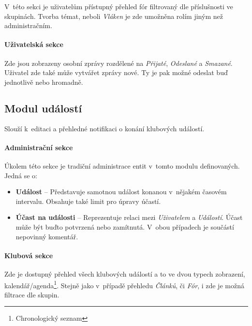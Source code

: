\documentclass[11pt,oneside]{fithesis}
\begin{document}
            V této sekci je uživatelům přístupný přehled fór filtrovaný dle příslušnosti ve skupinách.
            Tvorba témat, neboli \textit{Vláken} je zde umožněna rolím jiným než administračním.

            \paragraph*{Uživatelská sekce}

            Zde jsou zobrazeny osobní zprávy rozdělené na \textit{Přijaté}, \textit{Odeslané}       a \textit{Smazané}. Uživatel zde také může vytvářet zprávy nové. Ty je pak možné odeslat buď jednotlivě nebo hromadně.



            \subsection{Modul událostí}
            Slouží k editaci a přehledné notifikaci o konání klubových událostí.

            \paragraph*{Administrační sekce}

            Úkolem této sekce je tradiční administrace entit v tomto modulu definovaných.           Jedná se o:
            \begin{itemize}
                \item \textbf{Událost} – Představuje samotnou událost konanou v nějakém časovém intervalu. Obsahuje také limit pro úpravy účastí.
                \item \textbf{Účast na události} – Reprezentuje relaci mezi \textit{Uživatelem} a \textit{Událostí}. Účast může být buďto potvrzená nebo zamítnutá. V obou případech je součástí nepovinný komentář.
            \end{itemize}

            \paragraph*{Klubová sekce}

            Zde je dostupný přehled všech klubových událostí a to ve dvou typech zobrazení, kalendář/agenda\footnote{Chronologický seznam}. Stejně jako v případě přehledu \textit{Článků}, či \textit{Fór}, i zde je možná filtrace dle skupin.
\end{document}
